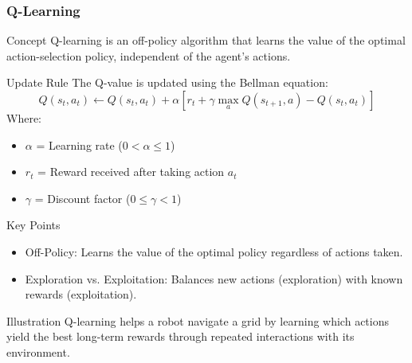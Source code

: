 \documentclass[aspectratio=169]{beamer}
\begin{document}
\begin{frame}[fragile]
    \frametitle{Q-Learning}
    \begin{block}{Concept}
        Q-learning is an off-policy algorithm that learns the value of the optimal action-selection policy, independent of the agent's actions.
    \end{block}
    
    \begin{block}{Update Rule}
        The Q-value is updated using the Bellman equation:
        \begin{equation}
        Q(s_t, a_t) \leftarrow Q(s_t, a_t) + \alpha \left[ r_t + \gamma \max_a Q(s_{t+1}, a) - Q(s_t, a_t) \right]
        \end{equation}
        Where:
        \begin{itemize}
            \item \( \alpha \) = Learning rate ($0 < \alpha \leq 1$)
            \item \( r_t \) = Reward received after taking action \( a_t \)
            \item \( \gamma \) = Discount factor ($0 \leq \gamma < 1$)
        \end{itemize}
    \end{block}
    
    \begin{block}{Key Points}
        \begin{itemize}
            \item Off-Policy: Learns the value of the optimal policy regardless of actions taken.
            \item Exploration vs. Exploitation: Balances new actions (exploration) with known rewards (exploitation).
        \end{itemize}
    \end{block}

    \begin{block}{Illustration}
        Q-learning helps a robot navigate a grid by learning which actions yield the best long-term rewards through repeated interactions with its environment.
    \end{block}
\end{frame}
\end{document}

